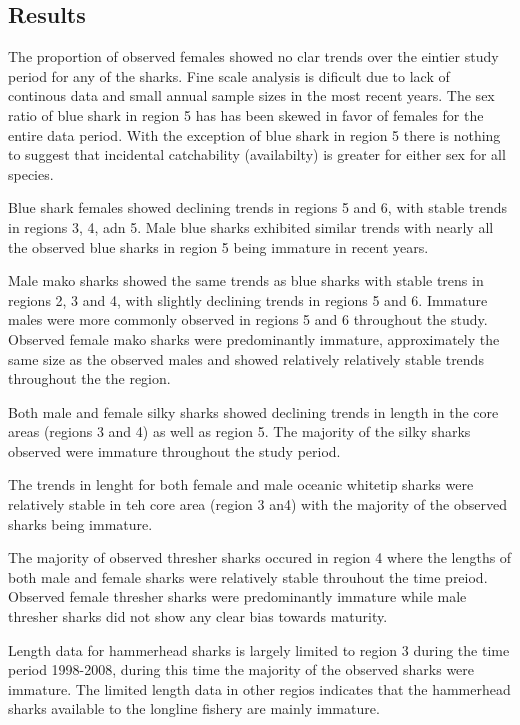 \documentclass[12pt]{SCreport}
\begin{document}
\subsection{Results}
    The proportion of observed females showed no clar trends over the eintier study period for any of the sharks.  Fine scale analysis is dificult due to lack of continous data and small annual sample sizes in the most recent years.   The sex ratio of blue shark in region 5 has has been skewed in favor of females for the entire data period. With the exception of blue shark in region 5 there is nothing to suggest that   incidental catchability (availabilty) is greater for either sex for all species.
    
Blue shark females showed declining trends in regions 5 and 6, with stable trends in regions 3, 4, adn 5. Male blue sharks exhibited similar trends with nearly all the observed blue sharks in region 5 being immature in recent years. 

Male mako sharks showed the same trends as blue sharks with stable trens in  regions 2, 3 and 4, with slightly declining trends in regions 5 and 6. Immature males were more commonly observed in regions 5 and 6 throughout the study.  Observed female mako sharks were predominantly immature, approximately the same size as the observed males and showed relatively relatively stable trends throughout the the region.

Both male and female silky sharks showed declining trends in length in the core areas (regions 3 and 4) as well as region 5.  The majority of the silky sharks observed were immature throughout the study period.

The trends in lenght for both female and male oceanic whitetip sharks were relatively stable in teh core area (region 3 an4) with the majority of the observed sharks being immature.

The majority of observed thresher sharks occured in region 4 where the lengths of both male and female sharks were relatively stable throuhout the time preiod. Observed female thresher sharks were predominantly immature while male thresher sharks did not show any clear bias towards maturity.

Length data for hammerhead sharks is largely limited to region 3 during the time period 1998-2008, during this time the majority of the observed sharks were immature. The limited length data in other regios indicates that the hammerhead sharks available to the longline fishery are mainly immature.
\end{document}
